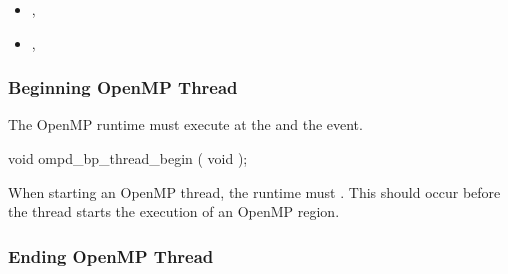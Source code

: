 %
%

\crossreferences
\begin{itemize}
\item
  , 
\item
  , 
\end{itemize}

\subsubsection{Beginning OpenMP Thread}
\label{subsubsec:ompd_bp_thread_begin}

\summary
The OpenMP runtime must execute %
 at the  and the  event.


\begin{cspecific}
\begin{ompSyntax}
void ompd_bp_thread_begin ( void );
\end{ompSyntax}
\end{cspecific}


\descr

When starting an OpenMP thread, the runtime must %
.
This should occur before the thread starts the execution of an
OpenMP region.

%
%

\subsubsection{Ending OpenMP Thread}
\label{subsubsec:ompd_bp_thread_begin}


